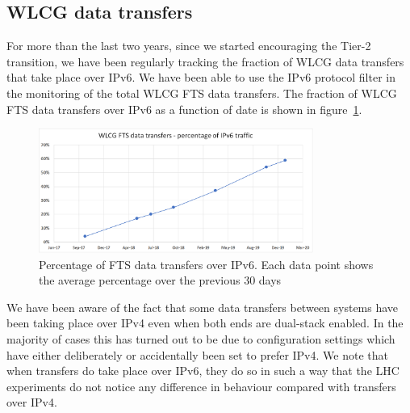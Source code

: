
\subsection{WLCG data transfers}

For more than the last two years, since we started encouraging the Tier-2 transition, we have been regularly tracking the fraction of WLCG data transfers that take place over IPv6. We have been able to use the IPv6 protocol filter in the monitoring of the total WLCG FTS \cite{fts3} data transfers.
The fraction of WLCG FTS data transfers over IPv6 as a function of date is shown in  figure~\ref{fig:FTS}.
\begin{figure}[h]
\centering
\includegraphics[width=9cm]{FTS-IPv6}
\caption{Percentage of FTS data transfers over IPv6. Each data point shows the average percentage over the previous 30 days}
\label{fig:FTS}
\end{figure}
\par We have been aware of the fact that some data transfers between systems have been taking place over IPv4 even when both ends are dual-stack enabled. In the majority of cases this has turned out to be due to configuration settings which have either deliberately or accidentally been set to prefer IPv4. We note that when transfers do take place over IPv6, they do so in such a way that the LHC experiments do not notice any difference in behaviour compared with transfers over IPv4.